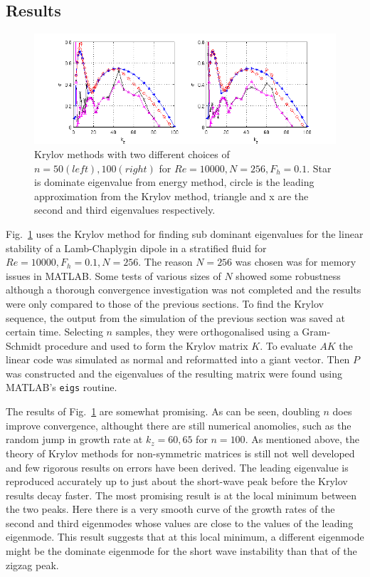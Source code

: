\subsection{Results}
\begin{figure}
\begin{center}
\includegraphics[scale=0.7]{final_data.png}
\caption{Krylov methods with two different choices of $n=50 (left), 100 (right)$ for $Re=10000, N=256, F_{h}=0.1$. Star is dominate eigenvalue from energy method, circle is the leading approximation from the Krylov method, triangle and x are the second and third eigenvalues respectively.}
\label{krylov_tests}
\end{center} 
\end{figure}
Fig.~\ref{krylov_tests} uses the Krylov method for finding sub dominant eigenvalues for the linear stability of a Lamb-Chaplygin dipole in a stratified fluid for $Re=10000, F_{h}=0.1, N=256$. The reason $N=256$ was chosen was for memory issues in MATLAB. Some tests of various sizes of $N$ showed some robustness although a thorough convergence investigation was not completed and the results were only compared to those of the previous sections. To find the Krylov sequence, the output from the simulation of the previous section was saved at certain time.  Selecting $n$ samples, they were orthogonalised using a Gram-Schmidt procedure  and used to form the Krylov matrix $K$. To evaluate $AK$ the linear code was simulated as normal and reformatted into a giant vector. Then $P$ was constructed and the eigenvalues of the resulting matrix were found using MATLAB's \texttt{eigs} routine. 

The results of Fig.~\ref{krylov_tests} are somewhat promising. As can be seen, doubling $n$ does improve convergence, althought there are still numerical anomolies, such as the random jump in growth rate at $k_{z}=60,65$ for $n=100$. As mentioned above, the theory of Krylov methods for non-symmetric matrices is still not well developed and few rigorous results on errors have been derived. The leading eigenvalue is reproduced accurately up to just about the short-wave peak before the Krylov results decay faster. The most promising result is at the local minimum between the two peaks. Here there is a very smooth curve of the growth rates of the second and third eigenmodes whose values are close to the values of the leading eigenmode. This result suggests that at this local minimum, a different eigenmode might be the dominate eigenmode for the short wave instability than that of the zigzag peak. 
